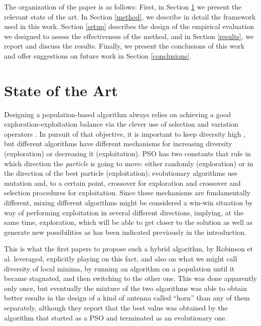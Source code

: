 \documentclass[runningheads]{llncs}
\begin{document}
The organization of the paper is as follows: First, in Section \ref{soa} we present
the relevant state of the art. In Section \ref{method}, we describe in detail the
framework used in this work.  Section \ref{setup} describes the design of the empirical
evaluation we designed to assess the effectiveness of the method, and in Section
\ref{results}, we report and discuss the results. Finally, we present the
conclusions of this work and offer suggestions on future work in Section
\ref{conclusions}.

\section{State of the Art}
\label{soa}

Designing a population-based algorithm always relies on achieving a
good exploration-exploitation balance via the clever use of selection
and variation operators \cite{vcrepinvsek2013exploration}. In pursuit
of that objective, it is important to keep diversity high
\cite{yuan2005importance}, but different algorithms have different
mechanisms for increasing diversity (exploration) or decreasing it
(exploitation). PSO has two constants that rule in which direction the
{\em particle} is going to move: either randomly (exploration) or in
the direction of the best particle (exploitation); evolutionary
algorithms use mutation and, to a certain point, crossover for
exploration and crossover and selection procedures for
exploitation. Since these mechanisms are fundamentally different,
mixing different algorithms might be considered a win-win situation by
way of performing exploitation in several different directions,
implying, at the same time, exploration, which will be able to get
closer to the solution as well as generate new possibilities as has
been indicated previously in the introduction.

This is what the first papers to propose such a hybrid algorithm, by
Robinson et al. \cite{Robinson2002} leveraged, explicitly playing on this
fact, and also on what we might call diversity of local minima, by
running an algorithm on a population until it became stagnated, and
then switching to the other one. This was done apparently only once,
but eventually the mixture of the two algorithms was able to obtain
better results in the design of a kind of antenna called ``horn'' than
any of them separately, although they report that the best value
was obtained by the algorithm that started as a PSO and terminated as
an evolutionary one.
\end{document}
